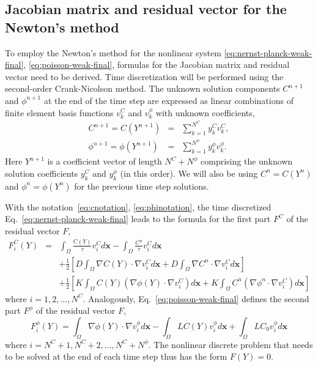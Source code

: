\subsection{Jacobian matrix and residual vector for the Newton's method}
To employ the Newton's method for the nonlinear system \eqref{eq:nernst-planck-weak-final},
\eqref{eq:poisson-weak-final}, formulas for the Jacobian matrix and residual vector need to
be derived. Time discretization will be performed using the second-order Crank-Nicolson 
method. The unknown solution components 
$C^{n+1}$ and $\phi^{n+1}$ at the end of the time step are expressed 
as linear combinations of finite element basis functions $v_k^{C}$ 
and $v_k^{\phi}$ with unknown coefficients,
\begin{eqnarray}
  C^{n+1} = C(Y^{n+1}) &=& \sum_{k=1}^{N^C} y_k^{C} v_k^{C}, \label{eq:cnotation}\\
  \phi^{n+1} = \phi(Y^{n+1}) &=& \sum_{k=1}^{N^{\phi}} y_k^{\phi} v_k^{\phi}\label{eq:phinotation}.
\end{eqnarray}
Here $Y^{n+1}$ is a coefficient vector of length $N^C + N^{\phi}$ comprising the unknown 
solution coefficients $y_k^{C}$ and $y_k^{\phi}$ (in this order). We will also be 
using $C^n = C(Y^n)$ and $\phi^n = \phi(Y^n)$ for the previous time step solutions.

With the notation~\eqref{eq:cnotation}, \eqref{eq:phinotation}, the time discretized 
Eq.~\eqref{eq:nernst-planck-weak-final} leads to the formula for the 
first part $F^C$ of the residual vector $F$,
\begin{eqnarray}
  F_i^C\left(Y\right) & = & \int_{\Omega} \frac{C(Y)}{\tau}v_i^C d\mathbf{x} - 
  \int_{\Omega} \frac{C^{n}}{\tau}v_i^C d\mathbf{x}\nonumber\\
  &&+\frac 12 \left[D\int_{\Omega} \nabla C(Y) \cdot \nabla v_i^C d\mathbf{x}+ 
  	D\int_{\Omega} \nabla C^{n} \cdot \nabla v_i^C d\mathbf{x}\right]\nonumber\\
  &&+ \frac 12 \left[K\int_{\Omega}C(Y) \left(\nabla \phi(Y) \cdot \nabla v_i^C\right) d\mathbf{x}+
  K\int_{\Omega}C^{n} \left(\nabla \phi^{n} \cdot \nabla v_i^C\right) d\mathbf{x}\right]\label{eq:Fc}
\end{eqnarray}
where $i = 1, 2, \ldots, N^C$.
Analogously, Eq.~\eqref{eq:poisson-weak-final} defines the second part $F^{\phi}$ 
of the residual vector $F$,
\begin{equation}
  F_i^{\phi}\left(Y\right) = \int_{\Omega} \nabla \phi(Y) \cdot \nabla v_i^{\phi} d\mathbf{x} 
  - \int_{\Omega} LC(Y)v_i^{\phi} d\mathbf{x} + \int_{\Omega} LC_0 v_i^{\phi} d\mathbf{x}
  \label{eq:Fphi}
\end{equation}
where $i = N^C + 1, N^C + 2, \ldots, N^C + N^{\phi}$. The nonlinear discrete problem 
that needs to be solved at the end of each time step thus has the form 
$F(Y) = 0$.

